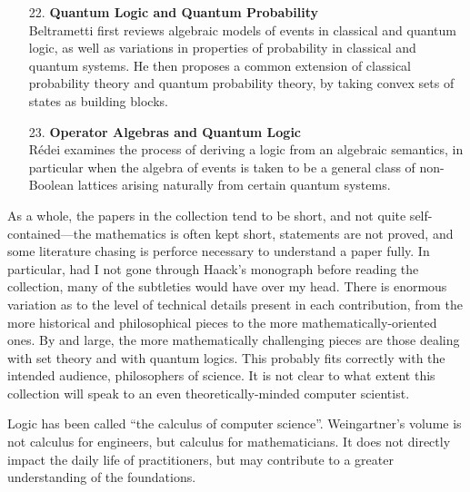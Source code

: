 \documentclass[11pt]{article}
\newcommand{\<}{\langle}
\renewcommand{\>}{\rangle}
\begin{document}
\begin{itemize}
\item[22.] \textbf{Quantum Logic and Quantum Probability}\\
Beltrametti first reviews algebraic models of events in classical and
quantum logic, as well as variations in properties of
probability in classical and quantum systems. He then proposes a
common extension of classical probability theory and quantum
probability theory, by taking convex sets of states as building
blocks. 

\item[23.] \textbf{Operator Algebras and Quantum Logic}\\
R\'edei examines the process of deriving a logic from an algebraic
semantics, in particular when the algebra of events is taken to be a
general class of non-Boolean lattices arising naturally from certain
quantum systems.


\end{itemize}

As a whole, the papers in the collection tend to be short, and not
quite self-contained---the mathematics is often kept short, statements
are not proved, and some literature chasing is perforce
necessary to understand a paper fully.
In particular, had I not gone through Haack's monograph before reading
the collection, many of the subtleties would have over my head. 
There is enormous variation as to the level of technical details
present in each contribution, from the more historical and
philosophical pieces to the more mathematically-oriented ones.
By and large, the more mathematically challenging pieces are those
dealing with set theory and with quantum logics.
This probably fits correctly with the intended audience, philosophers
of science.
It is not clear to what extent this collection will speak to an even
theoretically-minded computer scientist. 

Logic has been called ``the calculus of computer science''.
Weingartner's volume is not calculus for engineers, but calculus for
mathematicians. 
It does not directly impact the daily life of practitioners, but may
contribute to a greater understanding of the foundations. 
\end{document}
